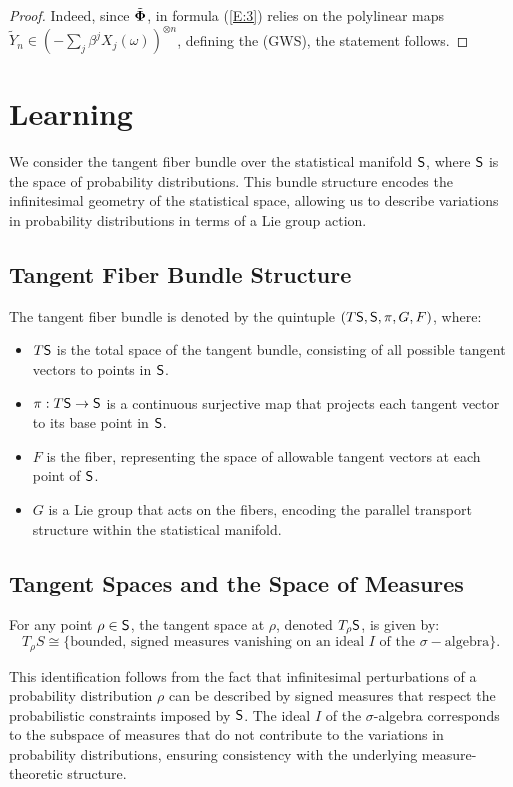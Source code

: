 \begin{proof}
Indeed, since $\tilde{\bf \Phi}$, in formula (\ref{E:3}) relies on the polylinear maps $\tilde{Y}_n\in \left(-\sum_{j}\beta^jX_j(\omega)\right)^{\otimes n}$,
 defining the (GWS), the statement follows. 
\end{proof}

\section{Learning}
We consider the tangent fiber bundle over the statistical manifold 
$\mathsf{S}$, where $\mathsf{S}$ is the space of probability distributions. This bundle structure encodes the infinitesimal geometry of the statistical space, allowing us to describe variations in probability distributions in terms of a Lie group action.
\subsection{Tangent Fiber Bundle Structure}
The tangent fiber bundle is denoted by the quintuple $(T\mathsf{S},\mathsf{S},\pi,G,F)$, where:
\begin{itemize}
    \item $T\mathsf{S}$ is the total space of the tangent bundle, consisting of all possible tangent vectors to points in $\mathsf{S}$.

    \item $\pi: T\mathsf{S}\to \mathsf{S}$ is a continuous surjective map that projects each tangent vector to its base point in $\mathsf{S}$.
    \item  $F$ is the fiber,  representing the space of allowable tangent vectors at each point of $\mathsf{S}$. 
    \item $G$ is a Lie group that acts on the fibers, encoding the parallel transport structure within the statistical manifold.
    
\end{itemize}
\subsection{Tangent Spaces and the Space of Measures}

For any point $\rho\in \mathsf{S}$, the tangent space at $\rho$, denoted 
$T_{\rho}\mathsf{S}$, is given by: 
\[T_{\rho}S \cong \{\text{bounded, signed measures vanishing on an ideal $I$ of the $\sigma-$algebra}\}.\]


This identification follows from the fact that infinitesimal perturbations of a probability distribution $\rho$ can be described by signed measures that respect the probabilistic constraints imposed by 
$\mathsf{S}$. The ideal 
$I$ of the 
$\sigma$-algebra corresponds to the subspace of measures that do not contribute to the variations in probability distributions, ensuring consistency with the underlying measure-theoretic structure.



